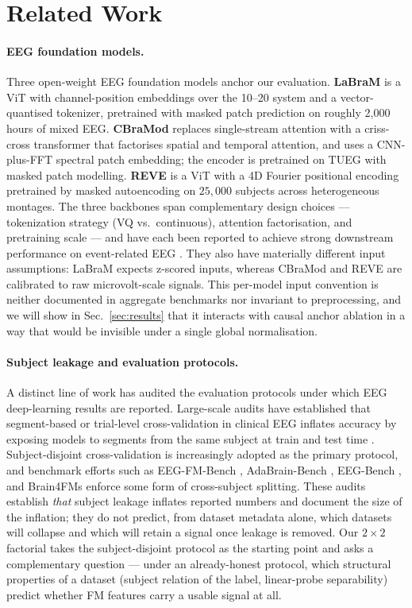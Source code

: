\section{Related Work}
\label{sec:related}

\paragraph{EEG foundation models.}
Three open-weight EEG foundation models anchor our evaluation.
\textbf{LaBraM} \citep{labram2024} is a ViT with
channel-position embeddings over the 10--20 system and a vector-quantised
tokenizer, pretrained with masked patch prediction on roughly 2{,}000
hours of mixed EEG. \textbf{CBraMod} \citep{cbramod2025} replaces
single-stream attention with a criss-cross transformer that factorises
spatial and temporal attention, and uses a CNN-plus-FFT spectral patch
embedding; the encoder is pretrained on TUEG with masked patch
modelling. \textbf{REVE} \citep{reve2025} is a ViT with a 4D Fourier
positional encoding pretrained by masked autoencoding on $25{,}000$
subjects across heterogeneous montages. The three backbones span
complementary design choices --- tokenization strategy (VQ vs.\
continuous), attention factorisation, and pretraining scale --- and
have each been reported to achieve strong downstream performance on
event-related EEG \citep{eegfmbench2025,adabrain2025}. They also have
materially different input assumptions: LaBraM expects z-scored
inputs, whereas CBraMod and REVE are calibrated to raw microvolt-scale
signals. This per-model input convention is neither documented in
aggregate benchmarks nor invariant to preprocessing, and we will show
in Sec.~\ref{sec:results} that it interacts with causal anchor
ablation in a way that would be invisible under a single global
normalisation.

\paragraph{Subject leakage and evaluation protocols.}
A distinct line of work has audited the evaluation protocols under
which EEG deep-learning results are reported. Large-scale audits have
established that segment-based or trial-level cross-validation in
clinical EEG inflates accuracy by exposing models to segments from the
same subject at train and test time
\citep{brookshire2024leakage,smalln2025biorxiv}. Subject-disjoint
cross-validation is increasingly adopted as the primary protocol, and
benchmark efforts such as EEG-FM-Bench \citep{eegfmbench2025},
AdaBrain-Bench \citep{adabrain2025}, EEG-Bench
\citep{eegbench2025}, and Brain4FMs \citep{brain4fms2026} enforce some
form of cross-subject splitting. These audits establish \emph{that}
subject leakage inflates reported numbers and document the size of the
inflation; they do not predict, from dataset metadata alone, which
datasets will collapse and which will retain a signal once leakage is
removed. Our $2\times 2$ factorial takes the subject-disjoint
protocol as the starting point and asks a complementary
question --- under an already-honest protocol, which structural
properties of a dataset (subject relation of the label, linear-probe
separability) predict whether FM features carry a usable signal at
all.

